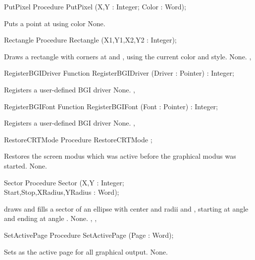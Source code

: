 \begin{procedure}{PutPixel}
\Declaration
Procedure PutPixel (X,Y : Integer; Color : Word);

\Description
Puts a point at
 using color 
\Errors
None.
\SeeAlso
{}
\end{procedure}
\begin{procedure}{Rectangle}
\Declaration
Procedure Rectangle (X1,Y1,X2,Y2 : Integer);

\Description
Draws a rectangle with
corners at  and , using the current color and
style.
\Errors
None.
\SeeAlso
{}, 
\end{procedure}
\begin{function}{RegisterBGIDriver}
\Declaration
Function RegisterBGIDriver (Driver : Pointer) : Integer;

\Description
Registers a user-defined BGI driver
\Errors
None.
\SeeAlso
{},
\end{function}
\begin{function}{RegisterBGIFont}
\Declaration
Function RegisterBGIFont (Font : Pointer) : Integer;

\Description
Registers a user-defined BGI driver
\Errors
None.
\SeeAlso
{},
\end{function}
\begin{procedure}{RestoreCRTMode}
\Declaration
Procedure RestoreCRTMode ;

\Description
Restores the screen modus which was active before
the graphical modus was started.
\Errors
None.
\SeeAlso
{}
\end{procedure}
\begin{procedure}{Sector}
\Declaration
Procedure Sector (X,Y : Integer; \\ Start,Stop,XRadius,YRadius : Word);

\Description
{}
draws and fills a sector of an ellipse  with center  and radii 
 and , starting at angle  and ending at angle .
\Errors
None.
\SeeAlso
{}, , 
\end{procedure}
\begin{procedure}{SetActivePage}
\Declaration
Procedure SetActivePage (Page : Word);

\Description
Sets  as the active page 
for all graphical output.
\Errors
None.
\SeeAlso

\end{procedure}
